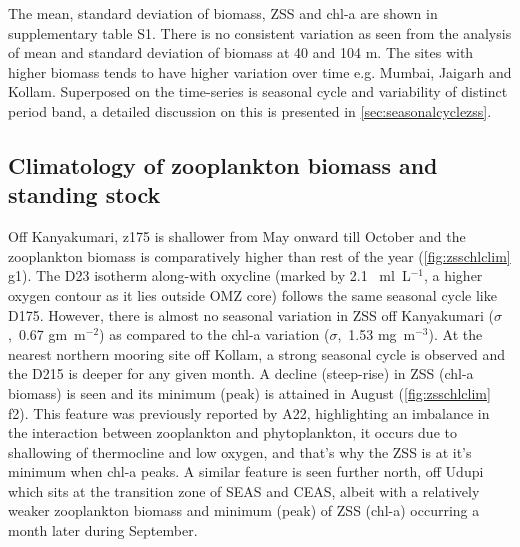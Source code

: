 \documentclass{article}
\begin{document}
	The mean, standard deviation of biomass, ZSS and chl-a are shown in supplementary table S1. There is no consistent variation as seen from the analysis of mean and standard deviation of biomass at 40 and 104 m. The sites with higher biomass tends to have higher variation over time e.g. Mumbai, Jaigarh and Kollam. Superposed on the time-series is seasonal cycle and variability of distinct period band, a detailed discussion on this is presented in \cref{sec:seasonalcyclezss}. 
		
	\subsection{Climatology of zooplankton biomass and standing stock}
	\label{sec:climatology}
	Off Kanyakumari, z175 is shallower from May onward till October and the zooplankton biomass is comparatively higher than rest of the year (\cref{fig:zsschlclim} g1). The D23 isotherm along-with oxycline (marked by 2.1 ~ml~L$^{-1}$, a higher oxygen contour as it lies outside OMZ core) follows the same seasonal cycle like D175. However, there is almost no seasonal variation in ZSS off Kanyakumari ($\sigma$,~0.67 gm~m$^{-2}$) as compared to the chl-a variation ($\sigma$,~1.53 mg~m$^{-3}$). At the nearest northern mooring site off Kollam, a strong seasonal cycle is observed and the D215 is deeper for any given month. A decline (steep-rise) in ZSS (chl-a  biomass) is seen and its minimum (peak) is attained in August (\cref{fig:zsschlclim} f2). This feature was previously reported by A22, highlighting an imbalance in the interaction between zooplankton and phytoplankton, it occurs due to shallowing of thermocline and low oxygen, and that's why the ZSS is at it's minimum when chl-a peaks. A similar feature is seen further north, off Udupi which sits at the transition zone of SEAS and CEAS, albeit with a relatively weaker zooplankton biomass and minimum (peak) of ZSS (chl-a) occurring a month later during September.
	
\end{document}
